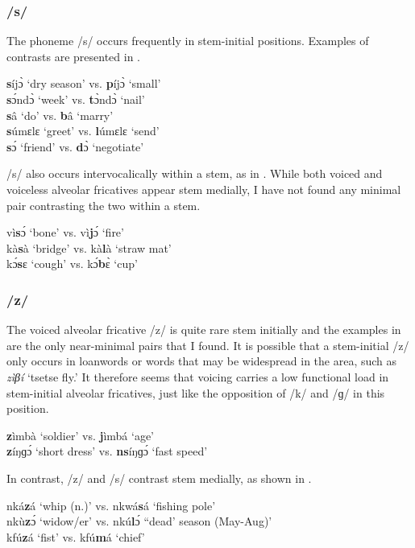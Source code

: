 \subsubsection*{\bfseries /s/} The phoneme /s/ occurs frequently in stem-initial positions. Examples of contrasts are presented in .

\ea \label{s}
{\bfseries s}íjɔ̀ `dry season' vs. {\bfseries p}íjɔ̀ `small' \\
{\bfseries s}ɔ́ndɔ̀ `week' vs. {\bfseries t}ɔ̀ndɔ̀ `nail' \\
{\bfseries s}â `do' vs. {\bfseries b}â `marry' \\
{\bfseries s}úmɛlɛ `greet' vs. {\bfseries l}úmɛlɛ `send' \\
{\bfseries s}ɔ́ `friend' vs. {\bfseries d}ɔ̀ `negotiate'
\z

\noindent /s/ also occurs intervocalically within a stem, as in . While both voiced and voiceless alveolar fricatives appear stem medially, I have not found any minimal pair contrasting the two within a stem.

\ea \label{sm}
vì{\bfseries s}ɔ́ `bone' vs. vì{\bfseries j}ɔ́ `fire' \\
kà{\bfseries s}à `bridge' vs. kà{\bfseries l}à `straw mat' \\
kɔ́{\bfseries s}ɛ `cough' vs. kɔ́{\bfseries b}ɛ̀ `cup'
\z

\subsubsection*{\bfseries /z/} The voiced alveolar fricative /z/ is quite rare stem initially and the examples in  are the only near-minimal pairs that I found. It is possible that a stem-initial /z/ only occurs in loanwords or words that may be widespread in the area, such as {\itshape zìβí} `tsetse fly.'
It therefore seems that voicing carries a low functional load in stem-initial alveolar fricatives, just like the opposition of /k/ and /ɡ/ in this position.

\ea \label{z}
{\bfseries z}ìmbà `soldier' vs. {\bfseries j}ìmbá `age' \\
{\bfseries z}íŋɡɔ́ `short dress' vs. {\bfseries ns}íŋɡɔ́ `fast speed'
\z

\noindent In contrast, /z/ and /s/ contrast stem medially, as shown in .

\ea \label{zm}
nká{\bfseries z}á `whip (n.)' vs. nkwá{\bfseries s}á `fishing pole' \\
nkù{\bfseries z}ɔ́ `widow/er' vs. nkú{\bfseries l}ɔ́ ``dead' season (May-Aug)' \\
kfú{\bfseries z}á `fist' vs. kfú{\bfseries m}á `chief'
\z

